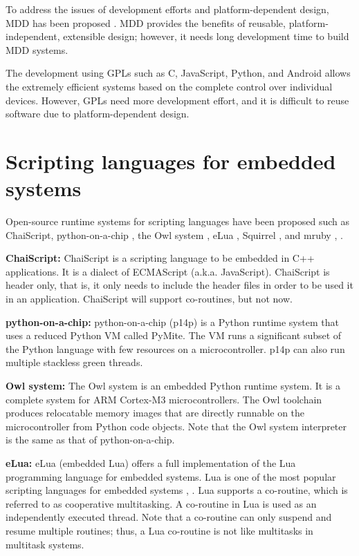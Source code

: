 \documentclass[a4j,12pt,oneside,openany,english]{jsbook}
\begin{document}
To address the issues of development efforts and platform-dependent design, MDD has been proposed \cite{par:MDD}.
MDD provides the benefits of reusable, platform-independent, extensible design; however, it needs long development time to build MDD systems.

The development using GPLs such as C, JavaScript, Python, and Android allows the extremely efficient systems based on the complete control over individual devices.
However, GPLs need more development effort, and it is difficult to reuse software due to platform-dependent design.

\section{Scripting languages for embedded systems}

Open-source runtime systems for scripting languages have been proposed such as ChaiScript\cite{url:ChaiScript}, python-on-a-chip \cite{url:python-on-a-chip}, the Owl system \cite{par:owl}, eLua \cite{url:eLua}, Squirrel \cite{url:Squirrel}, and mruby \cite{par:mruby}, \cite{url:mruby}.

{\bf ChaiScript:}
ChaiScript is a scripting language to be embedded in C++ applications.
It is a dialect of ECMAScript (a.k.a. JavaScript).
ChaiScript is header only, that is, it only needs to include the header files in order to be used it in an application.
ChaiScript will support co-routines, but not now. 

{\bf python-on-a-chip:}
python-on-a-chip (p14p) is a Python runtime system that uses a reduced Python VM called PyMite.
The VM runs a significant subset of the Python language with few resources on a microcontroller.
p14p can also run multiple stackless green threads.

{\bf Owl system:}
The Owl system is an embedded Python runtime system.
It is a complete system for ARM Cortex-M3 microcontrollers.
The Owl toolchain produces relocatable memory images that are directly runnable on the microcontroller from Python code objects.
Note that the Owl system interpreter is the same as that of python-on-a-chip.

{\bf eLua:}
eLua (embedded Lua) offers a full implementation of the Lua programming language for embedded systems.
Lua is one of the most popular scripting languages for embedded systems \cite{url:Lua}, \cite{par:Lua}.
Lua supports a co-routine, which is referred to as cooperative multitasking.
A co-routine in Lua is used as an independently executed thread.
Note that a co-routine can only suspend and resume multiple routines; thus, a Lua co-routine is not like multitasks in multitask systems.
\end{document}
